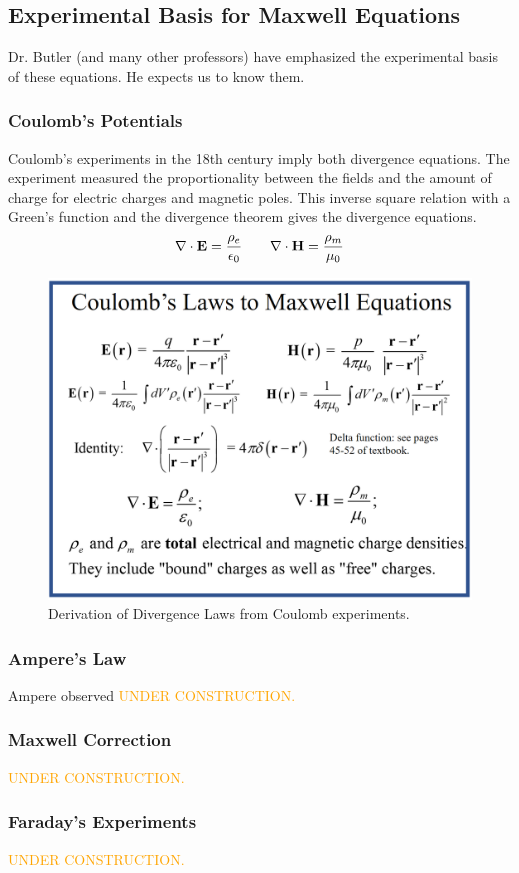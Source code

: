 \subsection{Experimental Basis for Maxwell Equations}
Dr. Butler (and many other professors) have emphasized the experimental basis of these equations. He expects us to know them.

\subsubsection{Coulomb's Potentials}
Coulomb's experiments in the 18th century imply both divergence equations. The experiment measured the proportionality between the fields and the amount of charge for electric charges and magnetic poles. This inverse square relation with a Green's function and the divergence theorem gives the divergence equations.
    \begin{align*}
        \nabla \cdot \mathbf{E} = \frac{\rho_e}{\epsilon_0} \hspace{20pt} \nabla \cdot \mathbf{H} = \frac{\rho_m}{\mu_0} \\
    \end{align*}

\begin{figure}[!hbtp]
    \centering
    \includegraphics[scale=.2]{Images/coloumb.png}
    \caption{Derivation of Divergence Laws from Coulomb experiments.}
    \label{fig:coulomb}
\end{figure}

\subsubsection{Ampere's Law}
Ampere observed 
\textcolor{orange}{UNDER CONSTRUCTION.}


\subsubsection{Maxwell Correction}
\textcolor{orange}{UNDER CONSTRUCTION.}


\subsubsection{Faraday's Experiments}
\textcolor{orange}{UNDER CONSTRUCTION.}